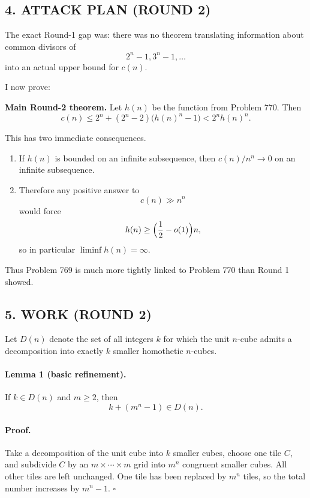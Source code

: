 \subsection*{4. ATTACK PLAN (ROUND 2)}

The exact Round-1 gap was: there was no theorem translating information about common divisors of
\[
2^n-1,3^n-1,\dots
\]
into an actual upper bound for $c(n)$.

I now prove:

\medskip
\noindent
\textbf{Main Round-2 theorem.}
Let $h(n)$ be the function from Problem 770.
Then
\[
c(n)\le 2^n+(2^n-2)\bigl(h(n)^n-1\bigr)<2^n h(n)^n.
\tag{4.1}
\]

This has two immediate consequences.

\begin{enumerate}
\item If $h(n)$ is bounded on an infinite subsequence, then $c(n)/n^n\to 0$ on an infinite subsequence.
\item Therefore any positive answer to
\[
c(n)\gg n^n
\]
would force
\[
h(n)\ge \Bigl(\frac12-o(1)\Bigr)n,
\]
so in particular $\liminf h(n)=\infty$.
\end{enumerate}

Thus Problem 769 is much more tightly linked to Problem 770 than Round 1 showed.

\subsection*{5. WORK (ROUND 2)}

Let $D(n)$ denote the set of all integers $k$ for which the unit $n$-cube admits a decomposition into exactly $k$ smaller homothetic $n$-cubes.

\paragraph{Lemma 1 (basic refinement).}
If $k\in D(n)$ and $m\ge 2$, then
\[
k+(m^n-1)\in D(n).
\]

\paragraph{Proof.}
Take a decomposition of the unit cube into $k$ smaller cubes, choose one tile $C$, and subdivide $C$ by an $m\times\cdots\times m$ grid into $m^n$ congruent smaller cubes.
All other tiles are left unchanged.
One tile has been replaced by $m^n$ tiles, so the total number increases by $m^n-1$.
\hfill$\square$

